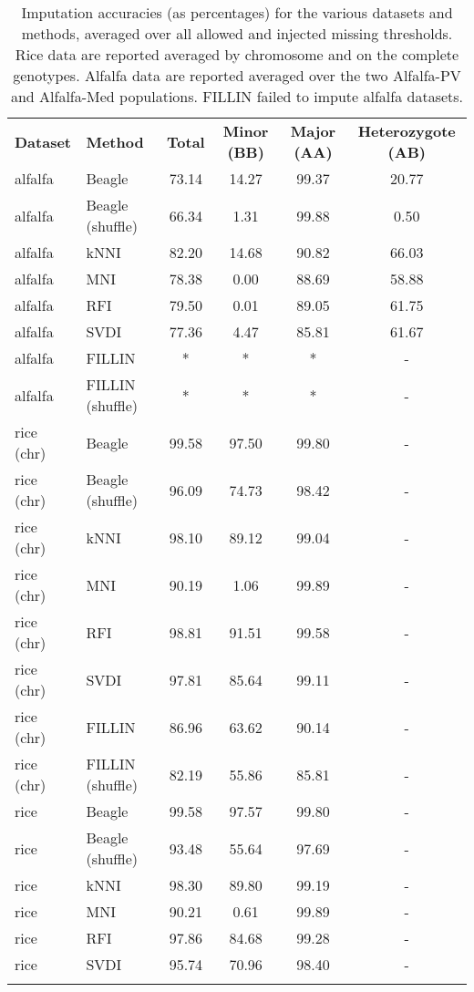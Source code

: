 \begin{table}
\centering
\caption[Accuracy statistics]{Imputation accuracies (as percentages) for the various
datasets and methods, averaged over all allowed and injected missing thresholds. Rice data are reported averaged by chromosome and on the complete genotypes. Alfalfa data are reported averaged over the two Alfalfa-PV and Alfalfa-Med populations. FILLIN failed to impute alfalfa datasets.}
\label{tab:accuracy_statistics}
\begin{tabular}{llcccc}
\hline\noalign{\smallskip}
\noalign{\smallskip}\hline\noalign{\smallskip}
\textbf{Dataset} & \textbf{Method} & \textbf{Total} & \textbf{Minor (BB)} & \textbf{Major (AA)} & \textbf{Heterozygote (AB)}\\
\noalign{\smallskip}\Xhline{3\arrayrulewidth}\noalign{\smallskip}
alfalfa & Beagle & 73.14 & 14.27 & 99.37 & 20.77\\
alfalfa & Beagle (shuffle) & 66.34 & 1.31 & 99.88 & 0.50\\
alfalfa & kNNI & 82.20 & 14.68 & 90.82 & 66.03\\
alfalfa & MNI & 78.38 & 0.00 & 88.69 & 58.88\\
alfalfa & RFI  & 79.50 & 0.01 & 89.05 & 61.75\\
alfalfa & SVDI & 77.36 & 4.47 & 85.81 & 61.67\\
alfalfa & FILLIN & * & * & * & -\\
alfalfa & FILLIN (shuffle)  & * & * & * & -\\
rice (chr) & Beagle & 99.58 & 97.50 & 99.80 & -\\
rice (chr) & Beagle (shuffle) & 96.09 & 74.73 & 98.42 & -\\
rice (chr) & kNNI & 98.10 & 89.12 & 99.04 & -\\
rice (chr) & MNI & 90.19 & 1.06 & 99.89 & -\\
rice (chr) & RFI  & 98.81 & 91.51 & 99.58 & -\\
rice (chr) & SVDI & 97.81 & 85.64 & 99.11 & -\\
rice (chr) & FILLIN & 86.96 & 63.62 & 90.14 & -\\
rice (chr) & FILLIN (shuffle)  & 82.19 & 55.86 & 85.81 & -\\
rice & Beagle & 99.58 & 97.57 & 99.80 & -\\
rice & Beagle (shuffle) & 93.48 & 55.64 & 97.69 & -\\
rice & kNNI & 98.30 & 89.80 & 99.19 & -\\
rice & MNI & 90.21 & 0.61 & 99.89 & -\\
rice & RFI  & 97.86 & 84.68 & 99.28 & -\\
rice & SVDI & 95.74 & 70.96 & 98.40 & -\\
\noalign{\smallskip}\hline
\end{tabular}
\end{table}



